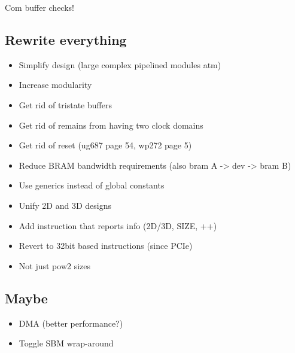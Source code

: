 \TODO Com buffer checks!

\subsection{Rewrite everything}

\begin{itemize}
    \item Simplify design (large complex pipelined modules atm)
    \item Increase modularity
    \item Get rid of tristate buffers
    \item Get rid of remains from having two clock domains
    \item Get rid of reset (ug687 page 54, wp272 page 5)
    \item Reduce BRAM bandwidth requirements (also bram A -> dev -> bram B)
    \item Use generics instead of global constants
    \item Unify 2D and 3D designs
    \item Add instruction that reports info (2D/3D, SIZE, ++)
    \item Revert to 32bit based instructions (since PCIe)
    \item Not just pow2 sizes
\end{itemize}

\subsection{Maybe}

\begin{itemize}
    \item DMA (better performance?)
    \item Toggle SBM wrap-around
\end{itemize}

